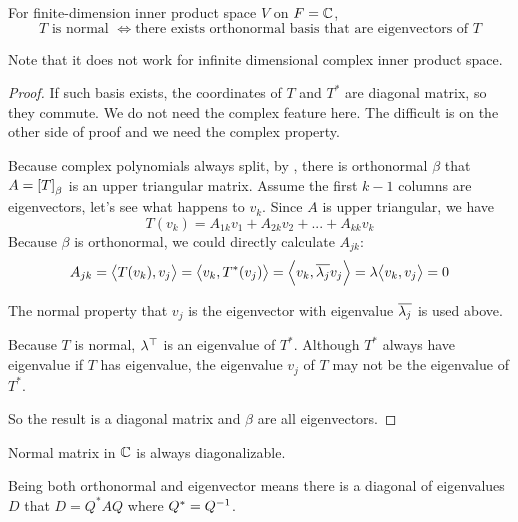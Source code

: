 \begin{theorem}\label{normal_orthonormal_with_complex_space}
    For finite-dimension inner product space $V$ on $F=\mathbb{C}$,
    \begin{equation}
        T \text{ is normal } \Leftrightarrow \text{there exists orthonormal basis that are eigenvectors of } T
    \end{equation}
    
    Note that it does not work for infinite dimensional complex inner product space.
\end{theorem}
\begin{proof}
    If such basis exists, the coordinates of $T$ and $T^*$ are diagonal matrix, so they commute. We do not need the complex feature here. The difficult is on the other side of proof and we need the complex property.
    
    Because complex polynomials always split, by , there is orthonormal $\beta$ that $A=\coordinate{T}_\beta$ is an upper triangular matrix. Assume the first $k-1$ columns are eigenvectors, let's see what happens to $v_{k}$. Since $A$ is upper triangular, we have
    \begin{equation*}
        T(v_k) = A_{1k} v_1 + A_{2k} v_2 + ... + A_{kk} v_k
    \end{equation*}
    Because $\beta$ is orthonormal, we could directly calculate $A_{jk}$:
    \begin{equation*}
        A_{jk} = \innerproduct{T(v_k)}{v_j} = \innerproduct{v_k}{T^*(v_j)} = \innerproduct{v_k}{\conjugate{\lambda_j} v_j} = \lambda \innerproduct{v_k}{v_j} = 0
    \end{equation*}
    
    The normal property that $v_j$ is the eigenvector with eigenvalue $\overline{\lambda_j}$ is used above.
    
    Because $T$ is normal, ${\lambda}^\top$ is an eigenvalue of $T^*$. Although $T^*$ always have eigenvalue if $T$ has eigenvalue, the eigenvalue $v_j$ of $T$ may not be the eigenvalue of $T^*$.
    
    So the result is a diagonal matrix and $\beta$ are all eigenvectors.
\end{proof}

\begin{theorem}
    Normal matrix in $\mathbb{C}$ is always diagonalizable.
\end{theorem}


Being both orthonormal and eigenvector means there is a diagonal of eigenvalues $D$ that $D = Q^* A Q$ where $Q^* = {Q}^{-1}$.


